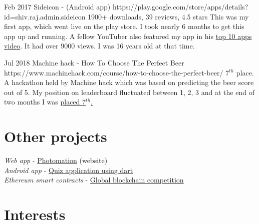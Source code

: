 \documentclass[10pt]{article} %
\begin{document}
\job
{Feb 2017}{}
{Sideicon - (Android app)}
{https://play.google.com/store/apps/details?id=shiv.raj.admin.sideicon}
{1900+ downloads, 39 reviews, 4.5 stars}
{This was my first app, which went live on the play store. I took nearly 6 months to get this app up and running. A fellow YouTuber also featured my app in his \href{https://youtu.be/2xnldqbf5Nc?t=137}{top 10 apps video}. It had over 9000 views. I was 16 years old at that time.}

\job
{Jul 2018}{}
{Machine hack - How To Choose The Perfect Beer}
{https://www.machinehack.com/course/how-to-choose-the-perfect-beer/}
{7$^{th}$ place.}
{A hackathon held by Machine hack which was based on predicting the beer score out of 5. My position on leaderboard fluctuated between 1, 2, 3 and at the end of two months I was \href{https://www.machinehack.com/course/how-to-choose-the-perfect-beer/leaderboard}{placed 7$^{th}$.}}


\section{Other projects}
{
	\textit{Web app} - \href{https://github.com/sbh69840/photo-mation}{Photomation} (website)\\
	\textit{Android app} - \href{https://github.com/sbh69840/interview}{Quiz application using dart}\\
	\textit{Ethereum smart contracts} - \href{https://github.com/sbh69840/CompanyBlockchain}{Global blockchain competition}\\
	
}







\section{Interests}

\end{document}
